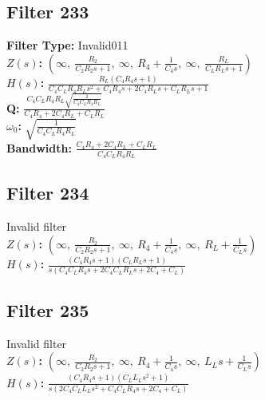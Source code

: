 \documentclass{article}
\begin{document}
\subsection*{Filter 233}
\textbf{Filter Type:} Invalid011 \\ 
\textbf{$Z(s)$:} $\left( \infty, \  \frac{R_{2}}{C_{2} R_{2} s + 1}, \  \infty, \  R_{4} + \frac{1}{C_{4} s}, \  \infty, \  \frac{R_{L}}{C_{L} R_{L} s + 1}\right)$ \\ 
\textbf{$H(s)$:} $\frac{R_{L} \left(C_{4} R_{4} s + 1\right)}{C_{4} C_{L} R_{4} R_{L} s^{2} + C_{4} R_{4} s + 2 C_{4} R_{L} s + C_{L} R_{L} s + 1}$ \\ 
\textbf{Q:} $\frac{C_{4} C_{L} R_{4} R_{L} \sqrt{\frac{1}{C_{4} C_{L} R_{4} R_{L}}}}{C_{4} R_{4} + 2 C_{4} R_{L} + C_{L} R_{L}}$ \\ 
\textbf{$\omega_0$:} $\sqrt{\frac{1}{C_{4} C_{L} R_{4} R_{L}}}$ \\ 
\textbf{Bandwidth:} $\frac{C_{4} R_{4} + 2 C_{4} R_{L} + C_{L} R_{L}}{C_{4} C_{L} R_{4} R_{L}}$ \\ 
\subsection*{Filter 234}
Invalid filter \\ 
\textbf{$Z(s)$:} $\left( \infty, \  \frac{R_{2}}{C_{2} R_{2} s + 1}, \  \infty, \  R_{4} + \frac{1}{C_{4} s}, \  \infty, \  R_{L} + \frac{1}{C_{L} s}\right)$ \\ 
\textbf{$H(s)$:} $\frac{\left(C_{4} R_{4} s + 1\right) \left(C_{L} R_{L} s + 1\right)}{s \left(C_{4} C_{L} R_{4} s + 2 C_{4} C_{L} R_{L} s + 2 C_{4} + C_{L}\right)}$ \\ 
\subsection*{Filter 235}
Invalid filter \\ 
\textbf{$Z(s)$:} $\left( \infty, \  \frac{R_{2}}{C_{2} R_{2} s + 1}, \  \infty, \  R_{4} + \frac{1}{C_{4} s}, \  \infty, \  L_{L} s + \frac{1}{C_{L} s}\right)$ \\ 
\textbf{$H(s)$:} $\frac{\left(C_{4} R_{4} s + 1\right) \left(C_{L} L_{L} s^{2} + 1\right)}{s \left(2 C_{4} C_{L} L_{L} s^{2} + C_{4} C_{L} R_{4} s + 2 C_{4} + C_{L}\right)}$ \\ 
\end{document}
